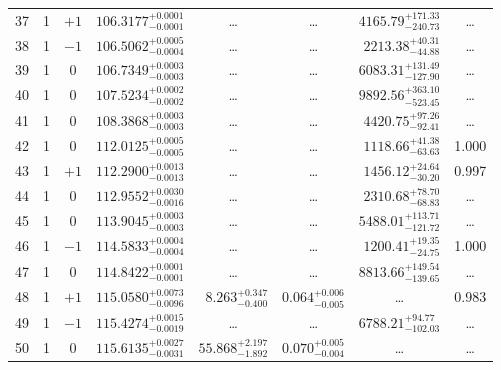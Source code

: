 \begin{table*}[!]
\begin{tabular}{llcrrlrc}
37 & 1 & $+1$ & $    106.3177_{-      0.0001}^{+      0.0001}$ & \multicolumn{1}{c}{\dots} & \multicolumn{1}{c}{\dots} & $     4165.79_{-      240.73}^{+      171.33}$ &\dots\\[1pt]
38 & 1 & $-1$ & $    106.5062_{-      0.0004}^{+      0.0005}$ & \multicolumn{1}{c}{\dots} & \multicolumn{1}{c}{\dots} & $     2213.38_{-       44.88}^{+       40.31}$ &\dots\\[1pt]
39 & 1 & 0 & $    106.7349_{-      0.0003}^{+      0.0003}$ & \multicolumn{1}{c}{\dots} & \multicolumn{1}{c}{\dots} & $     6083.31_{-      127.90}^{+      131.49}$ &\dots\\[1pt]
40 & 1 & 0 & $    107.5234_{-      0.0002}^{+      0.0002}$ & \multicolumn{1}{c}{\dots} & \multicolumn{1}{c}{\dots} & $     9892.56_{-      523.45}^{+      363.10}$ &\dots\\[1pt]
41 & 1 & 0 & $    108.3868_{-      0.0003}^{+      0.0003}$ & \multicolumn{1}{c}{\dots} & \multicolumn{1}{c}{\dots} & $     4420.75_{-       92.41}^{+       97.26}$ &\dots\\[1pt]

42 & 1 & 0 & $    112.0125_{-      0.0005}^{+      0.0005}$ & \multicolumn{1}{c}{\dots} & \multicolumn{1}{c}{\dots} & $     1118.66_{-       63.63}^{+       41.38}$ & 1.000\\[1pt]
43 & 1 & $+1$ & $    112.2900_{-      0.0013}^{+      0.0013}$ & \multicolumn{1}{c}{\dots} & \multicolumn{1}{c}{\dots} & $     1456.12_{-       30.20}^{+       24.64}$ & 0.997\\[1pt]
44 & 1 & 0 & $    112.9552_{-      0.0016}^{+      0.0030}$ & \multicolumn{1}{c}{\dots} & \multicolumn{1}{c}{\dots} & $     2310.68_{-       68.83}^{+       78.70}$ & \dots\\[1pt]
45 & 1 & 0 & $    113.9045_{-      0.0003}^{+      0.0003}$ & \multicolumn{1}{c}{\dots} & \multicolumn{1}{c}{\dots} & $     5488.01_{-      121.72}^{+      113.71}$ & \dots\\[1pt]
46 & 1 & $-1$ & $    114.5833_{-      0.0004}^{+      0.0004}$ & \multicolumn{1}{c}{\dots} & \multicolumn{1}{c}{\dots} & $     1200.41_{-       24.75}^{+       19.35}$ & 1.000\\[1pt]
47 & 1 & 0 & $    114.8422_{-      0.0001}^{+      0.0001}$ & \multicolumn{1}{c}{\dots} & \multicolumn{1}{c}{\dots} & $     8813.66_{-      139.65}^{+      149.54}$ & \dots\\[1pt]
48 & 1 & $+1$ & $    115.0580_{-      0.0096}^{+      0.0073}$ & $       8.263_{-       0.400}^{+       0.347}$ & $       0.064_{-       0.005}^{+       0.006}$ & \multicolumn{1}{c}{\dots} & 0.983\\[1pt] 
49 & 1 & $-1$ & $    115.4274_{-      0.0019}^{+      0.0015}$ & \multicolumn{1}{c}{\dots} & \multicolumn{1}{c}{\dots} & $     6788.21_{-      102.03}^{+       94.77}$ & \dots\\[1pt]
50  & 1 & 0 & $    115.6135_{-      0.0031}^{+      0.0027}$ & $      55.868_{-       1.892}^{+       2.197}$ & $       0.070_{-       0.004}^{+       0.005}$ & \multicolumn{1}{c}{\dots} & \dots\\[1pt]
\hline
\end{tabular}
\end{table*}

